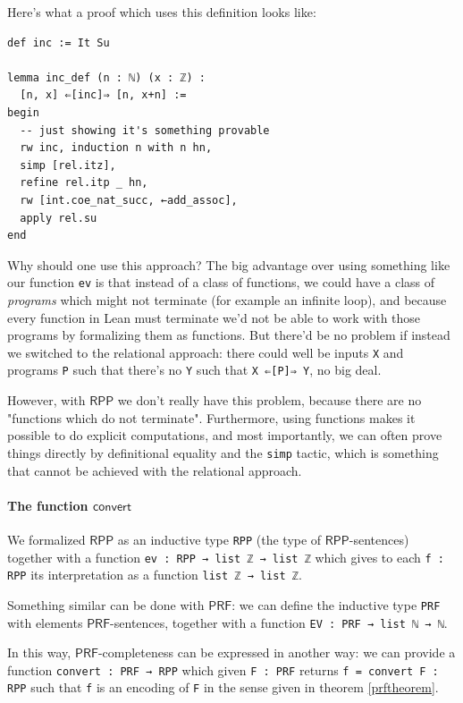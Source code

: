 \documentclass[oneside]{book}
\theoremstyle{definition}
\theoremstyle{remark}
\theoremstyle{plain}
\newcommand{\RPP}{\mathsf{RPP}}
\newcommand{\rppconvert}{\mathsf{convert}}
\newcommand{\PRF}{\mathsf{PRF}}
\begin{document}
Here's what a proof which uses this definition looks like:
\begin{lstlisting}
def inc := It Su

lemma inc_def (n : ℕ) (x : ℤ) :
  [n, x] ⇐[inc]⇒ [n, x+n] :=
begin
  -- just showing it's something provable
  rw inc, induction n with n hn,
  simp [rel.itz],
  refine rel.itp _ hn,
  rw [int.coe_nat_succ, ←add_assoc],
  apply rel.su
end
\end{lstlisting}

Why should one use this approach?
The big advantage over using something like our function \lstinline{ev} is that
instead of a class of functions, we could have a class of \textit{programs} which might not terminate (for example an infinite loop),
and because every function in Lean must terminate we'd not be able to work with those programs by formalizing them as functions.
But there'd be no problem if instead we switched to the relational approach:
there could well be inputs \lstinline{X} and programs \lstinline{P} such that there's no \lstinline{Y}
such that \lstinline{X ⇐[P]⇒ Y}, no big deal.

However, with $\RPP$ we don't really have this problem, because there are no "functions which do not terminate".
Furthermore, using functions makes it possible to do explicit computations, and most importantly,
we can often prove things directly by definitional equality and the \lstinline{simp} tactic,
which is something that cannot be achieved with the relational approach.

\paragraph{The function $\rppconvert$}

We formalized $\RPP$ as an inductive type \lstinline{RPP} (the type of $\RPP$-sentences)
together with a function \lstinline{ev : RPP → list ℤ → list ℤ}
which gives to each \lstinline{f : RPP} its interpretation as a function \lstinline{list ℤ → list ℤ}.

Something similar can be done with $\PRF$: we can define the inductive type \lstinline{PRF}
with elements $\PRF$-sentences, together with a function \lstinline{EV : PRF → list ℕ → ℕ}.

In this way, $\PRF$-completeness can be expressed in another way:
we can provide a function \lstinline{convert : PRF → RPP} which given \lstinline{F : PRF}
returns \lstinline{f = convert F : RPP} such that \lstinline{f} is an encoding of \lstinline{F} in the sense
given in theorem \ref{prftheorem}.
\end{document}
